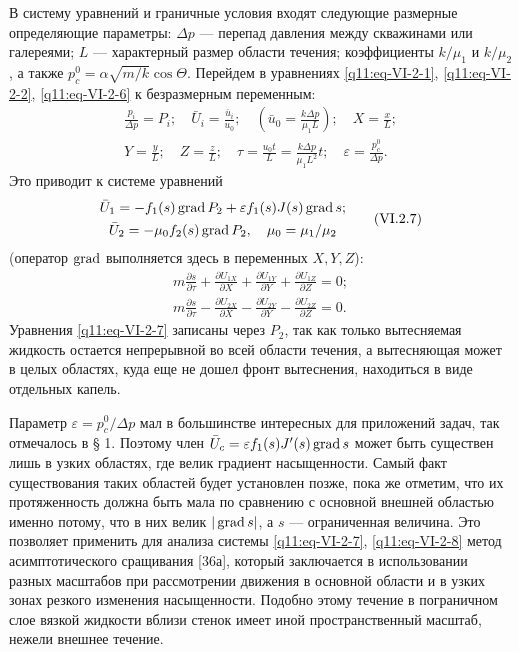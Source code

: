 В систему уравнений и граничные условия входят следующие размерные определяющие параметры: $\Delta p$ --- перепад давления между скважинами или галереями; $L$ --- характерный размер области течения; коэффициенты $k/\mu_1$ и $k/\mu_2$, а также $p_c^0=\alpha\sqrt{m/k}\cos\Theta$. Перейдем в уравнениях \eqref{q11:eq-VI-2-1}, \eqref{q11:eq-VI-2-2}, \eqref{q11:eq-VI-2-6} к безразмерным переменным:
\[\begin{gathered}
\frac{p_i}{\Delta p}=P_i;\quad\bar U_i=\frac{\bar u_i}{u_0};\quad\left(\bar u_0=\frac{k\Delta p}{\mu_1L}\right);\quad X=\frac{x}{L};\\
Y=\frac{y}{L};\quad Z=\frac{z}{L};\quad\tau=\frac{u_0t}{L}=\frac{k\Delta p}{\mu_1L^2}t;\quad\varepsilon=\frac{p_c^0}{\Delta p}.
\end{gathered}\]
Это приводит к системе уравнений
\begin{equation}\begin{gathered}
\bar U_1=-f_1(s)\operatorname{grad} P_2+\varepsilon f_1(s)J(s)\operatorname{grad} s;\\
\bar U_2=-\mu_0f_2(s)\operatorname{grad} P_2,\quad\mu_0=\mu_1/\mu_2
\end{gathered}\tag{VI.2.7}\label{q11:eq-VI-2-7}\end{equation}
(оператор $\operatorname{grad}$ выполняется здесь в переменных $X,Y,Z$):
\begin{equation}\begin{gathered}
m\frac{\partial s}{\partial\tau}+\frac{\partial U_{1X}}{\partial X}+\frac{\partial U_{1Y}}{\partial Y}+\frac{\partial U_{1Z}}{\partial Z}=0;\\
m\frac{\partial s}{\partial\tau}-\frac{\partial U_{2X}}{\partial X}-\frac{\partial U_{2Y}}{\partial Y}-\frac{\partial U_{2Z}}{\partial Z}=0.
\end{gathered}\tag{VI.2.8}\label{q11:eq-VI-2-8}\end{equation}
Уравнения \eqref{q11:eq-VI-2-7} записаны через $P_2$, так как только вытесняемая жидкость остается непрерывной во всей области течения, а вытесняющая может в целых областях, куда еще не дошел фронт вытеснения, находиться в виде отдельных капель.

Параметр $\varepsilon=p_c^0/\Delta p$ мал в большинстве интересных для приложений задач, так отмечалось в § 1. Поэтому член $\bar U_c=\varepsilon f_1(s)J'(s)\operatorname{grad} s$ может быть существен лишь в узких областях, где велик градиент насыщенности. Самый факт существования таких областей будет установлен позже, пока же отметим, что их протяженность должна быть мала по сравнению с основной внешней областью именно потому, что в них велик $|\operatorname{grad} s|$, а $s$ --- ограниченная величина. Это позволяет применить для анализа системы \eqref{q11:eq-VI-2-7}, \eqref{q11:eq-VI-2-8} метод асимптотического сращивания [36а], который заключается в использовании разных масштабов при рассмотрении движения в основной области и в узких зонах резкого изменения насыщенности. Подобно этому течение в пограничном слое вязкой жидкости вблизи стенок имеет иной пространственный масштаб, нежели внешнее течение.

